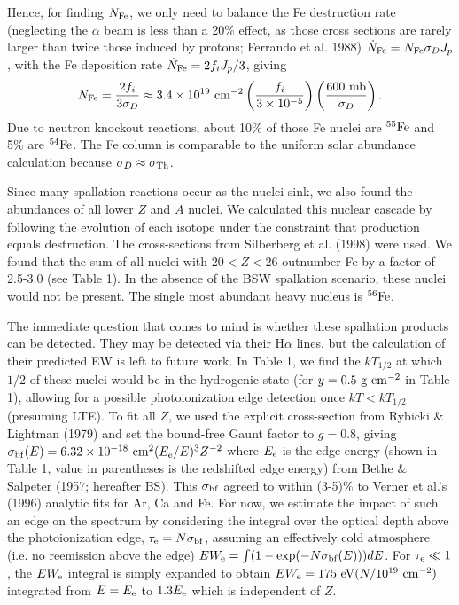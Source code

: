 \documentclass[iop,apjl,letterpaper]{emulateapj}
\begin{document}
Hence, for finding $N_{\rm Fe}$, we only need to balance the Fe
destruction rate (neglecting the $\alpha$ beam is less than a 20\%
effect, as those cross sections are rarely larger than twice those
induced by protons; Ferrando et al. 1988) $\dot N_{\rm Fe}=N_{\rm
Fe}\sigma_{D}J_p$, with the Fe deposition rate $\dot N_{\rm
Fe}=2f_iJ_p/3$, giving
\begin{equation}
N_{\rm Fe}={2f_i\over 3\sigma_{D}}\approx 3.4\times 10^{19} \ {\rm
cm^{-2}}\left(f_i\over 3\times 10^{-5}\right)\left(600 \ {\rm mb}\over
\sigma_{D}\right). 
\end{equation}
Due to neutron knockout reactions, about 10\% of those Fe nuclei are
$^{55}{\rm Fe}$ and 5\% are $^{54}{\rm Fe}$. The Fe column is
comparable to the uniform solar abundance calculation because
$\sigma_D\approx \sigma_{\rm Th}$.

Since many spallation reactions occur as the nuclei sink, we also
found the abundances of all lower $Z$ and $A$ nuclei. We calculated
this nuclear cascade by following the evolution of each isotope under
the constraint that production equals destruction. The cross-sections
from Silberberg et al. (1998) were used.  We found that the sum of all
nuclei with $20<Z<26$ outnumber Fe by a factor of 2.5-3.0 (see Table
1). In the absence of the BSW spallation scenario, these nuclei would
not be present.  The single most abundant heavy nucleus is $^{56}{\rm
Fe}$.

 The immediate question that comes to mind is whether these spallation
products can be detected.  They may be detected via their H$\alpha$
lines, but the calculation of their predicted EW is left to future
work.  In Table 1, we find the $kT_{1/2}$ at which $1/2$ of these
nuclei would be in the hydrogenic state (for $y=0.5\ {\rm g\ cm^{-2}}$
in Table 1), allowing for a possible photoionization edge detection
once $kT <kT_{1/2}$ (presuming LTE).  To fit all $Z$, we used the
explicit cross-section from Rybicki \& Lightman (1979) and set the
bound-free Gaunt factor to $g=0.8$, giving $\sigma_{\rm
bf}(E)=6.32\times 10^{-18}\ {\rm cm^2}(E_{\rm e}/E)^3 Z^{-2}$ where
$E_{\rm e}$ is the edge energy (shown in Table 1, value in parentheses
is the redshifted edge energy) from Bethe \& Salpeter (1957; hereafter
BS). This $\sigma_{\rm bf}$ agreed to within (3-5)\% to Verner et
al.'s (1996) analytic fits for Ar, Ca and Fe. For now, we estimate the
impact of such an edge on the spectrum by considering the integral
over the optical depth above the photoionization edge, $\tau_{\rm
e}=N\sigma_{\rm bf}$, assuming an effectively cold atmosphere (i.e. no
reemission above the edge) $EW_{\rm e}=\int (1-\exp(-N\sigma_{\rm
bf}(E)))dE$. For $\tau_{\rm e}\ll 1$, the $EW_{\rm e}$ integral is
simply expanded to obtain $EW_{\rm e}=175\ {\rm eV}(N/10^{19}\ {\rm
cm^{-2}})$ integrated from $E=E_{\rm e}$ to $1.3E_{\rm e}$ which is
independent of $Z$.
\end{document}
